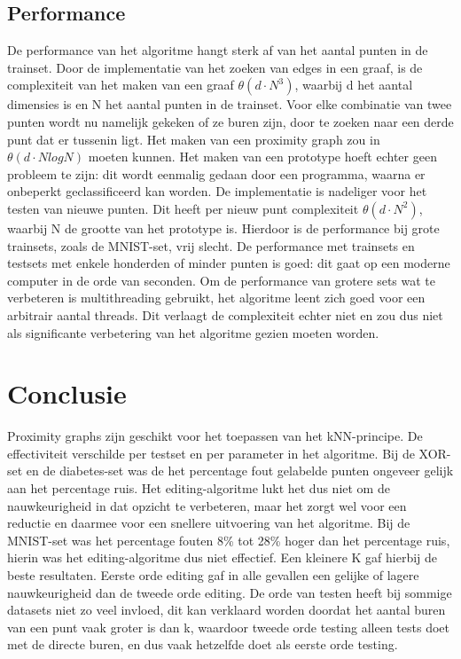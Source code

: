 \documentclass{article}
\begin{document}
\subsection{Performance}
De performance van het algoritme hangt sterk af van het aantal punten in de trainset. Door de implementatie van het zoeken van edges in een graaf, is de complexiteit van het maken van een graaf $\theta (d\cdot N^3)$, waarbij d het aantal dimensies is en N het aantal punten in de trainset. Voor elke combinatie van twee punten wordt nu namelijk gekeken of ze buren zijn, door te zoeken naar een derde punt dat er tussenin ligt. Het maken van een proximity graph zou in $\theta (d\cdot N log N)$ moeten kunnen. Het maken van een prototype hoeft echter geen probleem te zijn: dit wordt eenmalig gedaan door een programma, waarna er onbeperkt geclassificeerd kan worden. De implementatie is nadeliger voor het testen van nieuwe punten. Dit heeft per nieuw punt complexiteit $\theta (d\cdot N^2)$, waarbij N de grootte van het prototype is. Hierdoor is de performance bij grote trainsets, zoals de MNIST-set, vrij slecht. De performance met trainsets en testsets met enkele honderden of minder punten is goed: dit gaat op een moderne computer in de orde van seconden. Om de performance van grotere sets wat te verbeteren is multithreading gebruikt, het algoritme leent zich goed voor een arbitrair aantal threads. Dit verlaagt de complexiteit echter niet en zou dus niet als significante verbetering van het algoritme gezien moeten worden. 

\section{Conclusie}
Proximity graphs zijn geschikt voor het toepassen van het kNN-principe. De effectiviteit verschilde per testset en per parameter in het algoritme. Bij de XOR-set en de diabetes-set was de het percentage fout gelabelde punten ongeveer gelijk aan het percentage ruis. Het editing-algoritme lukt het dus niet om de nauwkeurigheid in dat opzicht te verbeteren, maar het zorgt wel voor een reductie en daarmee voor een snellere uitvoering van het algoritme. Bij de MNIST-set was het percentage fouten 8\% tot 28\% hoger dan het percentage ruis, hierin was het editing-algoritme dus niet effectief. Een kleinere K gaf hierbij de beste resultaten. Eerste orde editing gaf in alle gevallen een gelijke of lagere nauwkeurigheid dan de tweede orde editing. De orde van testen heeft bij sommige datasets niet zo veel invloed, dit kan verklaard worden doordat het aantal buren van een punt vaak groter is dan k, waardoor tweede orde testing alleen tests doet met de directe buren, en dus vaak hetzelfde doet als eerste orde testing.
\end{document}
